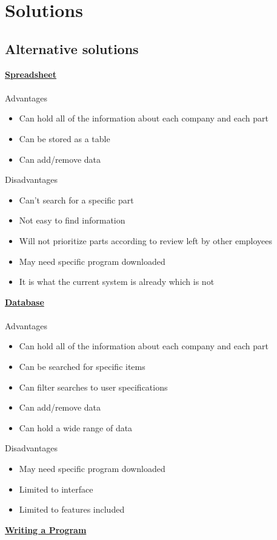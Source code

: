 \section{Solutions}

\subsection{Alternative solutions}
\textbf{\underline{Spreadsheet}}
\\
\\
{Advantages}
\begin{itemize}
	\item Can hold all of the information about each company and each part
	\item Can be stored as a table
	\item Can add/remove data
\end{itemize}
{Disadvantages}
\begin{itemize}
	\item Can't search for a specific part
	\item Not easy to find information
	\item Will not prioritize parts according to review left by other employees
	\item May need specific program downloaded
	\item It is what the current system is already which is not 
\end{itemize}
\textbf{\underline{Database}}
\\
\\
{Advantages}
\begin{itemize}
	\item Can hold all of the information about each company and each part
	\item Can be searched for specific items
	\item Can filter searches to user specifications 
	\item Can add/remove data
	\item Can hold a wide range of data
\end{itemize}
{Disadvantages}
\begin{itemize}
	\item May need specific program downloaded
	\item Limited to interface
	\item Limited to features included
\end{itemize}
\textbf{\underline{Writing a Program}}
\\
\\
